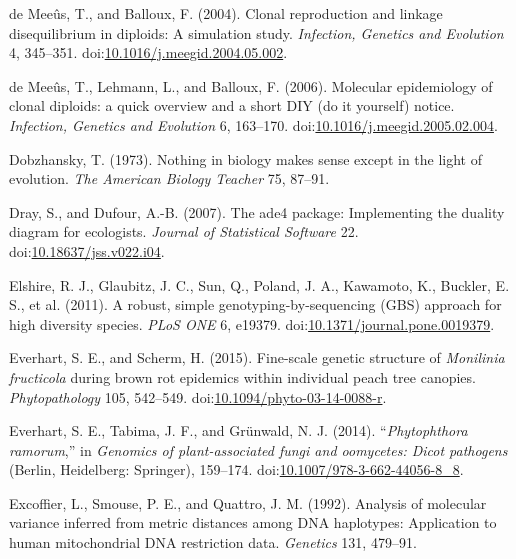 \documentclass[double,12pt]{beavtex}
\begin{document}
  \hypertarget{ref-de2004clonal}{}
  de Meeûs, T., and Balloux, F. (2004). Clonal reproduction and linkage
  disequilibrium in diploids: A simulation study. \emph{Infection,
  Genetics and Evolution} 4, 345--351.
  doi:\href{https://doi.org/10.1016/j.meegid.2004.05.002}{10.1016/j.meegid.2004.05.002}.
  
  \hypertarget{ref-de2006molecular}{}
  de Meeûs, T., Lehmann, L., and Balloux, F. (2006). Molecular
  epidemiology of clonal diploids: a quick overview and a short DIY (do it
  yourself) notice. \emph{Infection, Genetics and Evolution} 6, 163--170.
  doi:\href{https://doi.org/10.1016/j.meegid.2005.02.004}{10.1016/j.meegid.2005.02.004}.
  
  \hypertarget{ref-dobzhansky2013nothing}{}
  Dobzhansky, T. (1973). Nothing in biology makes sense except in the
  light of evolution. \emph{The American Biology Teacher} 75, 87--91.
  
  \hypertarget{ref-dray2007ade4}{}
  Dray, S., and Dufour, A.-B. (2007). The ade4 package: Implementing the
  duality diagram for ecologists. \emph{Journal of Statistical Software}
  22.
  doi:\href{https://doi.org/10.18637/jss.v022.i04}{10.18637/jss.v022.i04}.
  
  \hypertarget{ref-elshire2011robust}{}
  Elshire, R. J., Glaubitz, J. C., Sun, Q., Poland, J. A., Kawamoto, K.,
  Buckler, E. S., et al. (2011). A robust, simple genotyping-by-sequencing
  (GBS) approach for high diversity species. \emph{PLoS ONE} 6, e19379.
  doi:\href{https://doi.org/10.1371/journal.pone.0019379}{10.1371/journal.pone.0019379}.
  
  \hypertarget{ref-everhart2014fine}{}
  Everhart, S. E., and Scherm, H. (2015). Fine-scale genetic structure of
  \emph{Monilinia fructicola} during brown rot epidemics within individual
  peach tree canopies. \emph{Phytopathology} 105, 542--549.
  doi:\href{https://doi.org/10.1094/phyto-03-14-0088-r}{10.1094/phyto-03-14-0088-r}.
  
  \hypertarget{ref-everhart2014phytophthora}{}
  Everhart, S. E., Tabima, J. F., and Grünwald, N. J. (2014).
  ``\emph{Phytophthora ramorum},'' in \emph{Genomics of plant-associated
  fungi and oomycetes: Dicot pathogens} (Berlin, Heidelberg: Springer),
  159--174.
  doi:\href{https://doi.org/10.1007/978-3-662-44056-8_8}{10.1007/978-3-662-44056-8\_8}.
  
  \hypertarget{ref-excoffier1992analysis}{}
  Excoffier, L., Smouse, P. E., and Quattro, J. M. (1992). Analysis of
  molecular variance inferred from metric distances among DNA haplotypes:
  Application to human mitochondrial DNA restriction data. \emph{Genetics}
  131, 479--91.
  
\end{document}
